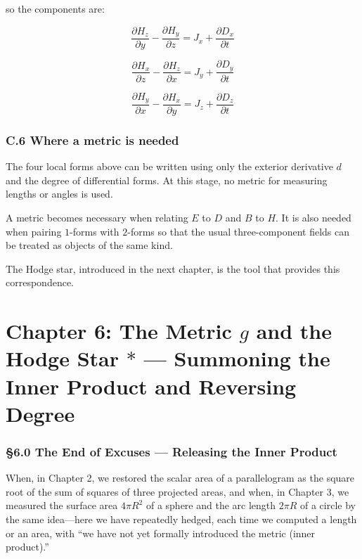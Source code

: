 so the components are:

\[
\frac{\partial H_z}{\partial y}
-
\frac{\partial H_y}{\partial z}
=
J_x+\frac{\partial D_x}{\partial t}
\]

\[
\frac{\partial H_x}{\partial z}
-
\frac{\partial H_z}{\partial x}
=
J_y+\frac{\partial D_y}{\partial t}
\]

\[
\frac{\partial H_y}{\partial x}
-
\frac{\partial H_x}{\partial y}
=
J_z+\frac{\partial D_z}{\partial t}
\]

\hypertarget{c.6-where-a-metric-is-needed}{%
\subsection{C.6 Where a metric is
needed}\label{c.6-where-a-metric-is-needed}}

The four local forms above can be written using only the exterior
derivative \(d\) and the degree of differential forms. At this stage, no
metric for measuring lengths or angles is used.

A metric becomes necessary when relating \(E\) to \(D\) and \(B\) to
\(H\). It is also needed when pairing \(1\)-forms with \(2\)-forms so
that the usual three-component fields can be treated as objects of the
same kind.

The Hodge star, introduced in the next chapter, is the tool that
provides this correspondence.

\newpage

\hypertarget{chapter-6-the-metric-g-and-the-hodge-star-ast-summoning-the-inner-product-and-reversing-degree}{%
\chapter{\texorpdfstring{Chapter 6: The Metric \(g\) and the Hodge Star
\(\ast\) --- Summoning the Inner Product and Reversing
Degree}{Chapter 6: The Metric g and the Hodge Star \textbackslash ast --- Summoning the Inner Product and Reversing Degree}}\label{chapter-6-the-metric-g-and-the-hodge-star-ast-summoning-the-inner-product-and-reversing-degree}}

\hypertarget{the-end-of-excuses-releasing-the-inner-product}{%
\subsection{§6.0 The End of Excuses --- Releasing the Inner
Product}\label{the-end-of-excuses-releasing-the-inner-product}}

When, in Chapter 2, we restored the scalar area of a parallelogram as
the square root of the sum of squares of three projected areas, and
when, in Chapter 3, we measured the surface area \(4\pi R^2\) of a
sphere and the arc length \(2\pi R\) of a circle by the same idea---here
we have repeatedly hedged, each time we computed a length or an area,
with ``we have not yet formally introduced the metric (inner product).''

